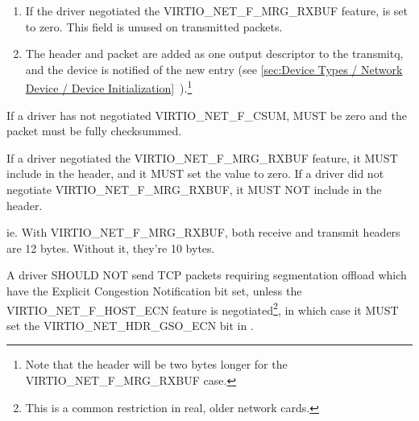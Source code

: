 \begin{enumerate}
\begin{itemize}
  \item {} is the maximum size of each packet beyond that
    header (ie. MSS).

  \item If the driver negotiated the VIRTIO_NET_F_HOST_ECN feature,
    the VIRTIO_NET_HDR_GSO_ECN bit may be set in  as
    well, indicating that the TCP packet has the ECN bit set.\footnote{This case is not handled by some older hardware, so is called out
specifically in the protocol.
}
   \end{itemize}

\item If the driver negotiated the VIRTIO_NET_F_MRG_RXBUF feature,
   is set to zero.  This field is unused on transmitted packets.

\item The header and packet are added as one output descriptor to the
  transmitq, and the device is notified of the new entry
  (see \ref{sec:Device Types / Network Device / Device Initialization}~).\footnote{Note that the header will be two bytes longer for the
VIRTIO_NET_F_MRG_RXBUF case.
}
\end{enumerate}


If a driver has not negotiated VIRTIO_NET_F_CSUM,  MUST be zero and
the packet must be fully checksummed.

If a driver negotiated the VIRTIO_NET_F_MRG_RXBUF feature, it MUST include
 in the header, and it MUST set the value to zero.  If a driver
did not negotiate VIRTIO_NET_F_MRG_RXBUF, it MUST NOT include  in the header.
\begin{note}
  ie. With VIRTIO_NET_F_MRG_RXBUF, both receive and transmit headers
  are 12 bytes.  Without it, they're 10 bytes.
\end{note}

A driver SHOULD NOT send TCP packets requiring segmentation offload which have the Explicit Congestion Notification bit set, unless the VIRTIO_NET_F_HOST_ECN feature is
negotiated\footnote{This is a common restriction in real, older network cards.}, in
which case it MUST set the VIRTIO_NET_HDR_GSO_ECN bit in .

